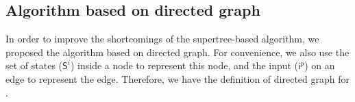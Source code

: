 \subsection{Algorithm based on directed graph}
In order to improve the shortcomings of the supertree-based algorithm, we proposed the algorithm based on directed graph. %
For convenience, we also use the set of states ($\mathsf{S}^i$) inside a node to represent this node, and the input ($\mathsf{i}^p$) on an edge to represent the edge.
Therefore, we have the definition of directed graph for \BCNs.
